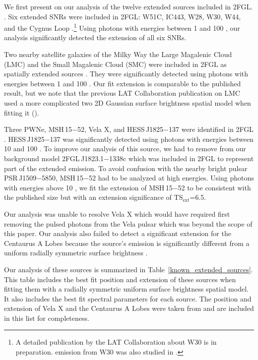 \documentclass[12pt,preprint]{aastex}
\newcommand{\gev}{\text{GeV}\xspace}
\newcommand{\tsext}{{\ensuremath{\text{TS}_{\text{ext}}}}\xspace}
\begin{document}

We first present on our analysis of the twelve extended sources
included in 2FGL.  \citep{second_cat}.  Six extended SNRs were
included in 2FGL: W51C, IC443, W28, W30, W44, and the Cygnus Loop
\citep{w51c,ic443,w28,w44,cygnus_loop_lat}.\footnote{A detailed
publication by the LAT Collaboration about W30 is in preparation.
\gev emission from W30 was also studied in \cite{castro_and_slane_2010}.
}
Using photons
with energies between
1 \gev and 100 \gev, our analysis significantly detected
the extension of all six SNRs.

Two nearby satellite galaxies of the Milky Way the Large Magalenic Cloud (LMC)
and the Small Magalenic
Cloud (SMC) were included in 2FGL as spatially extended sources \citep{lmc,smc}.  They were significantly
detected using photons with energies between
1 \gev and 100 \gev. Our
fit extension is comparable to the published result, but we note that
the previous LAT Collaboration publication on LMC used a more complicated two 2D Gaussian surface
brightness spatial model when fitting it (\citep{lmc}).

Three PWNe, MSH\,15$-$52, Vela X, and HESS\,J1825$-$137 were
identified in 2FGL \citep{msh1552,velax,fermi_hess_j1825}.  
HESS\,J1825$-$137 was significantly detected using photons
with energies between 10 \gev and 100 \gev.
To improve our analysis of this source, we had to remove
from our background model 
2FGL\,J1823.1$-$1338c which was included in 2FGL to
represent part of the extended emission.
To avoid confusion with the nearby bright pulsar PSR\,J1509$-$5850, MSH\,15$-$52 had
to be
analyzed at high energies.  Using photons with energies above 10 \gev,
we fit the extension of MSH\,15$-$52 to be consistent with the published
size but with an extension significance of \tsext=6.5.  

Our analysis was unable to resolve Vela X which would have required first
removing the pulsed photons from the Vela pulsar which was beyond the
scope of this paper.  Our analysis also failed to detect a significant
extension for the Centaurus A Lobes because
the source's emission is significantly different from a uniform
radially symmetric surface brightness \citep{cen_a_lat}.

Our analysis of these sources is summarized in
Table~\ref{known_extended_sources}.  This table includes the best fit
position and extension of these sources when fitting them 
with a radially symmetric uniform surface brightness spatial model. It also
includes the best fit spectral parameters for each source.  The position
and extension of Vela X and the Centaurus A Lobes were taken from
\cite{velax,cen_a_lat} and are included in this list for completeness.
\end{document}
